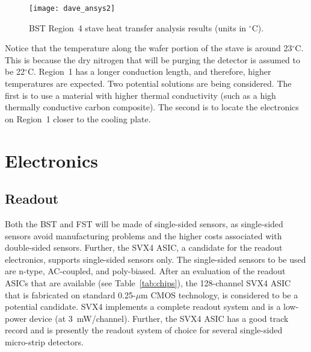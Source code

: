 \begin{figure}[htbp]
\centering
\texttt{[image: dave\_ansys2]}
\caption{\small{BST Region~4 stave heat transfer analysis results (units
in $^\circ$C).}}
\label{heat_r4}
\end{figure}

Notice that the temperature along the wafer portion of the stave is around 
23$^\circ$C.  This is because the dry nitrogen that will be purging the 
detector is assumed to be 22$^\circ$C.   Region~1 has a longer conduction 
length, and therefore, higher temperatures are expected.  Two potential 
solutions are being considered.  The first is to use a material with higher 
thermal conductivity (such as a high thermally conductive carbon composite).
The second is to locate the electronics on Region~1 closer to the cooling 
plate.
 
\section{Electronics}

\subsection{Readout}

Both the BST and FST  will be made of single-sided sensors, as single-sided
sensors avoid manufacturing problems and the higher costs associated with
double-sided sensors.  Further, the SVX4 ASIC, a candidate for the readout
electronics, supports single-sided sensors only.  The single-sided sensors
to be used are n-type, AC-coupled, and poly-biased.  After an evaluation of 
the readout ASICs that are available (see Table~\ref{tab:chips}), the 
128-channel SVX4 ASIC that is fabricated on standard 0.25-$\mu$m CMOS 
technology, is considered to be a potential candidate.  SVX4 implements a 
complete readout system and is a low-power device (at 3~mW/channel).  Further, 
the SVX4 ASIC has a good track record and is presently the readout system of 
choice for several single-sided micro-strip detectors.

